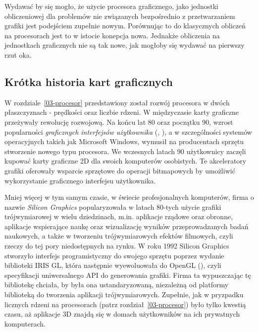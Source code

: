 Wydawać by się mogło, że użycie procesora graficznego, jako jednostki obliczeniowej dla problemów nie związanych bezpośrednio z przetwarzaniem grafiki jest podejściem zupełnie nowym. Porównując to do klasycznych obliczeń na procesorach jest to w istocie konepcja nowa. Jednakże obliczenia na jednostkach graficznych nie są tak nowe, jak mogłoby się wydawać na pierwszy rzut oka. 

\subsection{Krótka historia kart graficznych}

W rozdziale~\ref{03-procesor} przedstawiony został rozwój procesora w dwóch płaszczyznach - prędkości oraz liczbie rdzeni. W międzyczasie karty graficzne przeżywały rewolucję rozwojową. Na końcu lat 80 oraz początku 90, wzrost popularności \emph{graficznych interfejsów użytkownika} (, ), a w szczególności systemów operacyjnych takich jak Microsoft Windows, wymusił na producentach sprzętu stworzenie nowego typu procesora. We wczesnych latach 90 użytkownicy zaczęli kupować karty graficzne 2D dla swoich komputerów osobistych. Te akceleratory grafiki oferowały wsparcie sprzętowe do operacji bitmapowych by umożliwić wykorzystanie graficznego interfejsu użytkownika.

Mniej więcej w tym samym czasie, w świecie profesjonalnych komputerów, firma o nazwie \emph{Silicon Graphics} popularyzowała w latach 80-tych użycie grafiki trójwymiarowej w wielu dziedzinach, m.in. aplikacje rządowe oraz obronne, aplikacje wspierające naukę oraz wizualizację wyników przeprowadzanych badań naukowych, a także w tworzeniu trójwymiarowych efektów filmowych, czyli rzeczy do tej pory niedostępnych na rynku. W roku 1992 Silicon Graphics stworzyło interfejs programistyczny do swojego sprzętu poprzez wydanie biblioteki IRIS GL, która następnie wyewoluowała do OpenGL (), czyli specyfikacji uniwersalnego API do generowania grafiki. Firma ta wypuszczając tę bibliotekę chciała, by była ona ustandaryzowaną, niezależną od platformy biblioteką do tworzenia aplikacji trójwymiarowych. Zupełnie, jak w pryzpadku licznych rdzeni na procesorach (patrz rozdział~\ref{03-procesor}) było tylko kwestią czasu, aż aplikacje 3D znajdą się w domach użytkowników na ich prywatnych komputerach.


